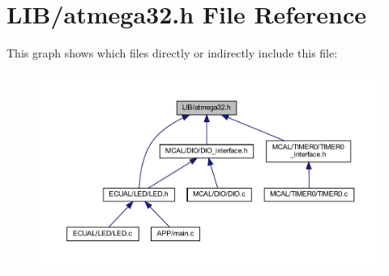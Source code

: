\section{L\+I\+B/atmega32.h File Reference}
\label{atmega32_8h}
This graph shows which files directly or indirectly include this file\+:\nopagebreak
\begin{figure}[H]
\begin{center}
\leavevmode
\includegraphics[width=350pt]{atmega32_8h__dep__incl}
\end{center}
\end{figure}

